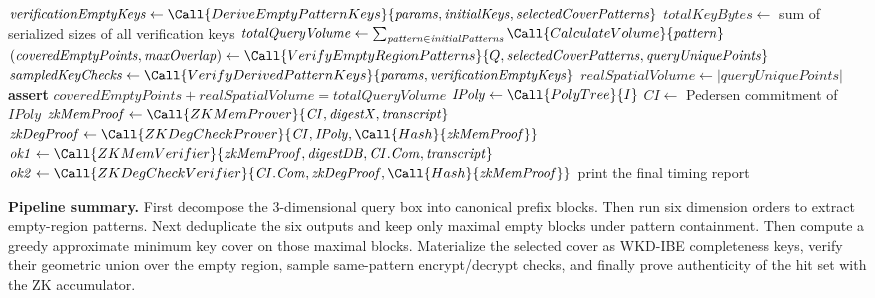 \begin{algorithm}[t]
\begin{algorithmic}[1]
    \State $\mathit{verificationEmptyKeys} \gets \Call{DeriveEmptyPatternKeys}{\mathit{params}, \mathit{initialKeys}, \mathit{selectedCoverPatterns}}$
    \State $\mathit{totalKeyBytes} \gets$ sum of serialized sizes of all verification keys
    \State $\mathit{totalQueryVolume} \gets \sum_{\mathit{pattern} \in \mathit{initialPatterns}} \Call{CalculateVolume}{\mathit{pattern}}$
    \State $(\mathit{coveredEmptyPoints}, \mathit{maxOverlap}) \gets \Call{VerifyEmptyRegionPatterns}{Q, \mathit{selectedCoverPatterns}, \mathit{queryUniquePoints}}$
    \State $\mathit{sampledKeyChecks} \gets \Call{VerifyDerivedPatternKeys}{\mathit{params}, \mathit{verificationEmptyKeys}}$
    \State $\mathit{realSpatialVolume} \gets |\mathit{queryUniquePoints}|$
    \State \textbf{assert} $\mathit{coveredEmptyPoints} + \mathit{realSpatialVolume} = \mathit{totalQueryVolume}$
    \State $\mathit{IPoly} \gets \Call{PolyTree}{I}$
    \State $\mathit{CI} \gets$ Pedersen commitment of $\mathit{IPoly}$
    \State $\mathit{zkMemProof} \gets \Call{ZKMemProver}{\mathit{CI}, \mathit{digestX}, \mathit{transcript}}$
    \State $\mathit{zkDegProof} \gets \Call{ZKDegCheckProver}{\mathit{CI}, \mathit{IPoly}, \Call{Hash}{\mathit{zkMemProof}}}$
    \State $\mathit{ok1} \gets \Call{ZKMemVerifier}{\mathit{zkMemProof}, \mathit{digestDB}, \mathit{CI}.\mathit{Com}, \mathit{transcript}}$
    \State $\mathit{ok2} \gets \Call{ZKDegCheckVerifier}{\mathit{CI}.\mathit{Com}, \mathit{zkDegProof}, \Call{Hash}{\mathit{zkMemProof}}}$
    \State print the final timing report
\EndProcedure
\end{algorithmic}
\end{algorithm}

\noindent\textbf{Pipeline summary.}
First decompose the 3-dimensional query box into canonical prefix blocks.
Then run six dimension orders to extract empty-region patterns.
Next deduplicate the six outputs and keep only maximal empty blocks under pattern containment.
Then compute a greedy approximate minimum key cover on those maximal blocks.
Materialize the selected cover as WKD-IBE completeness keys, verify their geometric union over the empty region, sample same-pattern encrypt/decrypt checks, and finally prove authenticity of the hit set with the ZK accumulator.
